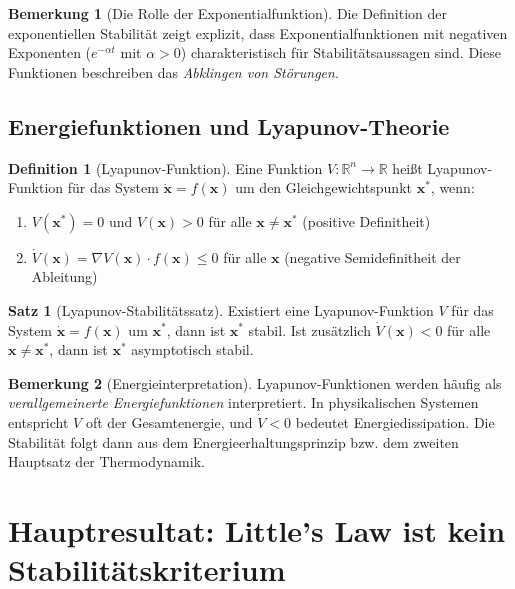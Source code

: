 ﻿\documentclass[a4paper,12pt]{report}
\theoremstyle{definition}
\newtheorem{definition}{Definition}[section]
\newtheorem{bemerkung}{Bemerkung}[section]
\newtheorem{satz}{Satz}[section]
\begin{document}
\begin{bemerkung}[Die Rolle der Exponentialfunktion]
	Die Definition der exponentiellen Stabilität zeigt explizit, dass Exponentialfunktionen mit negativen Exponenten ($e^{-\alpha t}$ mit $\alpha > 0$) charakteristisch für Stabilitätsaussagen sind. Diese Funktionen beschreiben das \textit{Abklingen von Störungen}.
\end{bemerkung}

\subsection{Energiefunktionen und Lyapunov-Theorie}

\begin{definition}[Lyapunov-Funktion]
	Eine Funktion $V: \mathbb{R}^n \to \mathbb{R}$ heißt Lyapunov-Funktion für das System $\dot{\mathbf{x}} = f(\mathbf{x})$ um den Gleichgewichtspunkt $\mathbf{x}^*$, wenn:
	\begin{enumerate}
		\item[-] $V(\mathbf{x}^*) = 0$ und $V(\mathbf{x}) > 0$ für alle $\mathbf{x} \neq \mathbf{x}^*$ (positive Definitheit)
		\item[-] $\dot{V}(\mathbf{x}) = \nabla V(\mathbf{x}) \cdot f(\mathbf{x}) \leq 0$ für alle $\mathbf{x}$ (negative Semidefinitheit der Ableitung)
	\end{enumerate}
\end{definition}

\begin{satz}[Lyapunov-Stabilitätssatz]
	Existiert eine Lyapunov-Funktion $V$ für das System $\dot{\mathbf{x}} = f(\mathbf{x})$ um $\mathbf{x}^*$, dann ist $\mathbf{x}^*$ stabil. Ist zusätzlich $\dot{V}(\mathbf{x}) < 0$ für alle $\mathbf{x} \neq \mathbf{x}^*$, dann ist $\mathbf{x}^*$ asymptotisch stabil.
\end{satz}

\begin{bemerkung}[Energieinterpretation]
	Lyapunov-Funktionen werden häufig als \textit{verallgemeinerte Energiefunktionen} interpretiert. In physikalischen Systemen entspricht $V$ oft der Gesamtenergie, und $\dot{V} < 0$ bedeutet Energiedissipation. Die Stabilität folgt dann aus dem Energieerhaltungsprinzip bzw. dem zweiten Hauptsatz der Thermodynamik.
\end{bemerkung}

\section{Hauptresultat: Little's Law ist kein Stabilitätskriterium}
\end{document}
